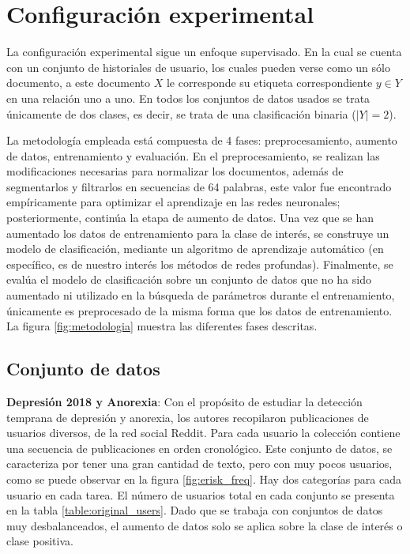 
\section{Configuración experimental}

La configuración experimental sigue un enfoque supervisado. En la cual se cuenta con un conjunto de historiales de usuario, los cuales pueden verse como un sólo documento, a este documento $X$ le corresponde su etiqueta correspondiente $y \in Y$  en una relación uno a uno. En todos los conjuntos de datos usados se trata únicamente de dos clases, es decir, se trata de una clasificación binaria ($|Y| = 2$). 

La metodología empleada está compuesta de 4 fases:  preprocesamiento, aumento de datos, entrenamiento y evaluación. En el preprocesamiento, se realizan las modificaciones necesarias para normalizar los documentos, además de segmentarlos y filtrarlos en secuencias de 64 palabras, este valor fue encontrado empíricamente para optimizar el aprendizaje en las redes neuronales; posteriormente, continúa la etapa de aumento de datos. Una vez que se han aumentado los datos de entrenamiento para la clase de interés, se construye un modelo de clasificación, mediante un algoritmo de aprendizaje automático (en específico, es de nuestro interés los métodos de redes profundas). Finalmente, se evalúa el modelo de clasificación sobre un conjunto de datos que no ha sido aumentado ni utilizado en la búsqueda de parámetros durante el entrenamiento, únicamente es preprocesado de la misma forma que los datos de entrenamiento. La figura \ref{fig:metodologia} muestra las diferentes fases descritas. 



\subsection{Conjunto de datos}

\textbf{Depresión 2018 y Anorexia}: Con el propósito de estudiar la detección temprana de depresión y anorexia, los autores \citep{Losada2018} recopilaron publicaciones de usuarios diversos, de la red social Reddit. Para cada usuario la colección contiene una secuencia de publicaciones en orden cronológico. Este conjunto de datos, se caracteriza por tener una gran cantidad de texto, pero con muy pocos usuarios, como se puede observar en la figura \ref{fig:erisk_freq}. Hay dos categorías para cada usuario en cada tarea. El número de usuarios total en cada conjunto se presenta en la tabla \ref{table:original_users}. Dado que se trabaja con conjuntos de datos muy desbalanceados, el aumento de datos solo se aplica sobre la clase de interés o clase positiva.

